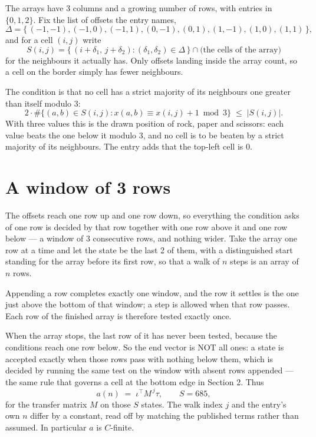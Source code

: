 \documentclass[11pt,a4paper]{article}
\theoremstyle{plain}
\theoremstyle{definition}
\begin{document}
The arrays have $3$ columns and a growing number of rows, with entries in $\{0,1,2\}$. Fix the
list of offsets the entry names,
\[
\Delta=\{\,(-1,-1), (-1,0), (-1,1), (0,-1), (0,1), (1,-1), (1,0), (1,1)\,\},
\]
and for a cell $(i,j)$ write
\[
S(i,j)=\{\,(i+\delta_1,\,j+\delta_2) : (\delta_1,\delta_2)\in\Delta\,\}\cap
\text{(the cells of the array)}
\]
for the neighbours it actually has. Only offsets landing inside the array count, so a cell on
the border simply has fewer neighbours.

The condition is that no cell has a strict majority of its neighbours one greater than itself modulo $3$:
\[
2\cdot\#\{(a,b)\in S(i,j) : x(a,b)\equiv x(i,j)+1 \bmod 3\}\;\le\;|S(i,j)| .
\]
With three values this is the drawn position of rock, paper and scissors: each value beats the one below it modulo $3$, and no cell is to be beaten by a strict majority of its neighbours. The entry adds that the top-left cell is $0$.

\section{A window of 3 rows}

The offsets reach one row up and one row down, so everything the condition asks of one row is
decided by that row together with one row above it and one row below --- a window of
$3$ consecutive rows, and nothing wider. Take the array one row at a time
and let the state be the last 2 of them, with a distinguished start standing for the
array before its first row, so that a walk of $n$ steps is an array of $n$ rows.

Appending a row completes exactly one window, and the row it settles is the one just above the bottom of that window; a step is
allowed when that row passes. Each row of the finished
array is therefore tested exactly once.

When the array stops, the last row of it has never been tested, because the
conditions reach one row below. So the end vector is NOT all ones: a state is accepted exactly when
those rows pass with nothing below them, which is decided by running the same test on the window
with absent rows appended --- the same rule that governs a cell at the bottom edge in
Section 2.
Thus
\[
a(n)\;=\;\iota^{\!\top}M^{\,j}\tau ,\qquad S=685,
\]
for the transfer matrix $M$ on those $S$ states. The walk index $j$ and the entry's own $n$
differ by a constant, read off by matching the published terms rather than assumed. In
particular $a$ is $C$-finite.
\end{document}
